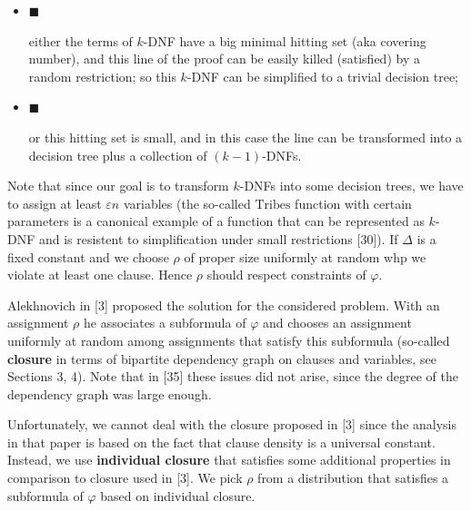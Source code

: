 \documentclass[10pt,a4paper]{article}
\begin{document}
\begin{itemize}


\item[] 
$\blacksquare$ 


either the terms of $k$-DNF have a big minimal hitting set (aka covering number), and this
line of the proof can
be easily killed (satisfied) by a random restriction; so this $k$-DNF can be simplified to a
trivial decision tree;\par





\item[] 
$\blacksquare$ 


or this hitting set is small, and in this case the line can be transformed into a decision tree
plus a collection of $(k-1)$-DNFs.\par





\end{itemize}




Note that since our goal is to transform $k$-DNFs into some decision trees, we have to assign at least
$\varepsilon n$ variables (the so-called $\mathrm{Tribes}$ function with certain parameters is a canonical
example of a function that can be represented as $k$-DNF and is resistent to simplification under small
restrictions [30]). If $\Delta$ is a fixed constant and we choose $\rho$ of proper size
uniformly at random whp we violate at least one clause. Hence $\rho$ should respect constraints of
$\varphi$.\par




Alekhnovich in [3] proposed the solution for the considered problem. With an assignment
$\rho$ he associates a subformula of $\varphi$ and chooses an assignment uniformly at random among
assignments that satisfy this subformula (so-called \textbf{closure} in terms of bipartite dependency graph
on clauses and variables,
see Sections 3, 4). Note that in
[35] these issues did not arise, since the degree of the dependency graph was
large enough.\par




Unfortunately, we cannot deal with the closure proposed in [3] since the analysis in that
paper is based on the fact that clause density is a universal constant. Instead, we use
\textbf{individual closure} that satisfies some additional properties in comparison to closure used in
[3]. We pick $\rho$ from a distribution that satisfies a subformula of $\varphi$ based on
individual closure.\par
\end{document}
